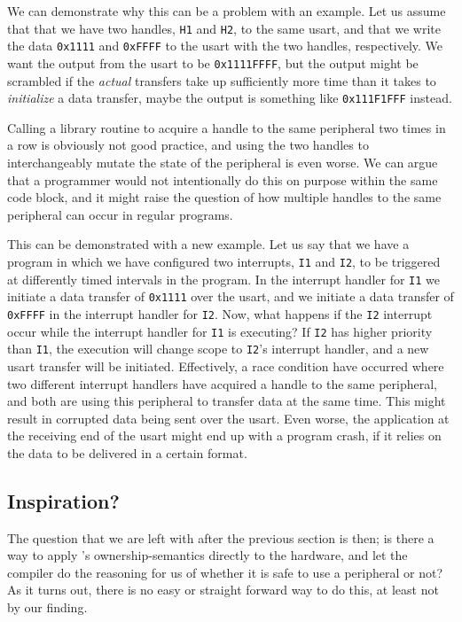 We can demonstrate why this can be a problem with an example.
Let us assume that that we have two handles, \texttt{H1} and \texttt{H2}, to the same \gls{usart}, and that we write the data \texttt{0x1111} and \texttt{0xFFFF} to the \gls{usart} with the two handles, respectively.
We want the output from the \gls{usart} to be \texttt{0x1111FFFF}, but the output might be scrambled if the \emph{actual} transfers take up sufficiently more time than it takes to \emph{initialize} a data transfer, maybe the output is something like \texttt{0x111F1FFF} instead.

Calling a library routine to acquire a handle to the same peripheral two times in a row is obviously not good practice, and using the two handles to interchangeably mutate the state of the peripheral is even worse.
We can argue that a programmer would not intentionally do this on purpose within the same code block, and it might raise the question of how multiple handles to the same peripheral can occur in regular programs.

This can be demonstrated with a new example.
Let us say that we have a program in which we have configured two interrupts, \texttt{I1} and \texttt{I2}, to be triggered at differently timed intervals in the program.
In the interrupt handler for \texttt{I1} we initiate a data transfer of \texttt{0x1111} over the \gls{usart}, and we initiate a data transfer of \texttt{0xFFFF} in the interrupt handler for \texttt{I2}.
Now, what happens if the \texttt{I2} interrupt occur while the interrupt handler for \texttt{I1} is executing?
If \texttt{I2} has higher priority than \texttt{I1}, the execution will change scope to \texttt{I2}'s interrupt handler, and a new \gls{usart} transfer will be initiated.
Effectively, a race condition have occurred where two different interrupt handlers have acquired a handle to the same peripheral, and both are using this peripheral to transfer data at the same time.
This might result in corrupted data being sent over the \gls{usart}.
Even worse, the application at the receiving end of the \gls{usart} might end up with a program crash, if it relies on the data to be delivered in a certain format.

\subsection{Inspiration?}
The question that we are left with after the previous section is then; is there a way to apply {\rust}'s ownership-semantics directly to the hardware, and let the {\rust} compiler do the reasoning for us of whether it is safe to use a peripheral or not?
As it turns out, there is no easy or straight forward way to do this, at least not by our finding.

